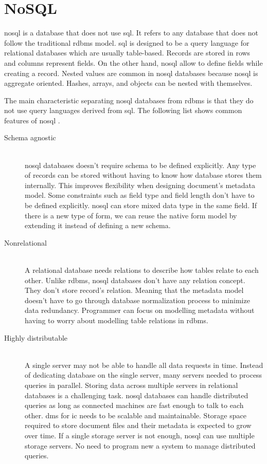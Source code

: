 \section{NoSQL}
\gls{nosql} is a database that does not use \gls{sql}.
It refers to any database that does not follow the traditional \gls{rdbms} model.
\gls{sql} is designed to be a query language for relational databases which are usually table-based.
Records are stored in rows and columns represent fields.
On the other hand, \gls{nosql} allow to define fields while creating a record.
Nested values are common in \gls{nosql} databases because \gls{nosql} is aggregate oriented.
Hashes, arrays, and objects can be nested with themselves.

The main characteristic separating \gls{nosql} databases from \gls{rdbms} is that they do not use query languages derived from \gls{sql}. 
The following list shows common features of \gls{nosql} \cite[p.~12-16]{nosql-for-dummies}.
\begin{description}
	\item[Schema agnostic] \hfill \\
	\gls{nosql} databases doesn't require schema to be defined explicitly.
	Any type of records can be stored without having to know how database stores them internally.
	This improves flexibility when designing document's metadata model.
	Some constraints such as field type and field length don't have to be defined explicitly.
	\gls{nosql} can store mixed data type in the same field.
	If there is a new type of form, we can reuse the native form model by extending it instead of defining a new schema.
	\item[Nonrelational] \hfill \\
	A relational database needs relations to describe how tables relate to each other.
	Unlike \gls{rdbms}, \gls{nosql} databases don't have any relation concept.
	They don't store record's relation.
	Meaning that the metadata model doesn't have to go through database normalization process to minimize data redundancy.
	Programmer can focus on modelling metadata without having to worry about modelling table relations in \gls{rdbms}.
	
	\item[Highly distributable] \hfill \\
	A single server may not be able to handle all data requests in time.
	Instead of dedicating database on the single server, many servers needed to process queries in parallel.
	Storing data across multiple servers in relational databases is a challenging task.
	\gls{nosql} databases can handle distributed queries as long as connected machines are fast enough to talk to each other.
	\gls{dms} for \gls{ic} needs to be scalable and maintainable.
	Storage space required to store document files and their metadata is expected to grow over time.
	If a single storage server is not enough, \gls{nosql} can use multiple storage servers.
	No need to program new a system to manage distributed queries.
\end{description}

